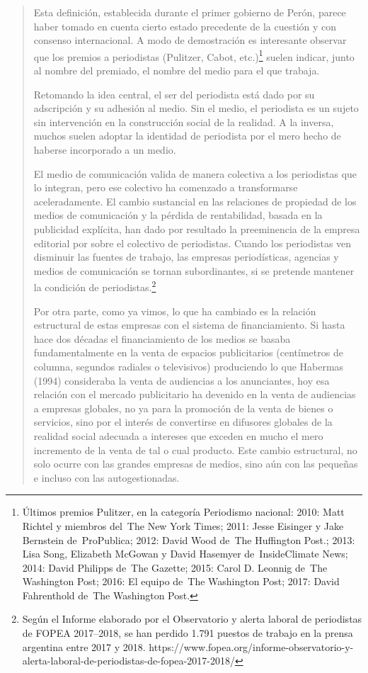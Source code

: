 \begin{quote}
Esta definición, establecida durante el primer gobierno de Perón, parece haber tomado en cuenta cierto estado precedente de la cuestión y con consenso internacional. A modo de demostración es interesante observar que los premios a periodistas (Pulitzer, Cabot, etc.)\footnote{Últimos premios Pulitzer, en la categoría Periodismo nacional:  2010: Matt Richtel y miembros del The New York Times; 2011: Jesse Eisinger y Jake Bernstein de ProPublica;  2012: David Wood de The Huffington Post.;  2013: Lisa Song, Elizabeth McGowan y David Hasemyer de InsideClimate News; 2014: David Philipps de The Gazette;  2015: Carol D. Leonnig de The Washington Post; 2016: El equipo de The Washington Post; 2017: David Fahrenthold de The Washington Post.} suelen indicar, junto al nombre del premiado, el nombre del medio para el que trabaja.

Retomando la idea central, el ser del periodista está dado por su adscripción y su adhesión al medio. Sin el medio, el periodista es un sujeto sin intervención en la construcción social de la realidad. A la inversa, muchos suelen adoptar la identidad de periodista por el mero hecho de haberse incorporado a un medio.

El medio de comunicación valida de manera colectiva a los periodistas que lo integran, pero ese colectivo ha comenzado a transformarse aceleradamente. El cambio sustancial en las relaciones de propiedad de los medios de comunicación y la pérdida de rentabilidad, basada en la publicidad explícita, han dado por resultado la preeminencia de la empresa editorial por sobre el colectivo de periodistas. Cuando los periodistas ven disminuir las fuentes de trabajo, las empresas periodísticas, agencias y medios de comunicación se tornan subordinantes, si se pretende mantener la condición de periodistas.\footnote{Según el Informe elaborado por el Observatorio y alerta laboral de periodistas de FOPEA 2017–2018, se han perdido 1.791 puestos de trabajo en la prensa argentina entre 2017 y 2018.  https://www.fopea.org/informe-observatorio-y-alerta-laboral-de-periodistas-de-fopea-2017-2018/}

Por otra parte, como ya vimos, lo que ha cambiado es la relación estructural de estas empresas con el sistema de financiamiento. Si hasta hace dos décadas el financiamiento de los medios se basaba fundamentalmente en la venta de espacios publicitarios (centímetros de columna, segundos radiales o televisivos) produciendo lo que Habermas (1994) consideraba la venta de audiencias a los anunciantes, hoy esa relación con el mercado publicitario ha devenido en la venta de audiencias a empresas globales, no ya para la promoción de la venta de bienes o servicios, sino por el interés de convertirse en difusores globales de la realidad social adecuada a intereses que exceden en mucho el mero incremento de la venta de tal o cual producto. Este cambio estructural, no solo ocurre con las grandes empresas de medios, sino aún con las pequeñas e incluso con las autogestionadas.


\end{quote}
